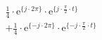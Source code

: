 \begin{align*}
&  \frac{1}{4} \cdot \textrm{e}^{\{ j \cdot 2\pi \}} \cdot \textrm{e}^{\{ j \cdot \frac{\pi}{2} \cdot t \}} \\
&+ \frac{1}{4} \cdot \textrm{e}^{\{-j \cdot 2\pi \}} \cdot \textrm{e}^{\{-j \cdot \frac{\pi}{2} \cdot t \}}
\end{align*}
